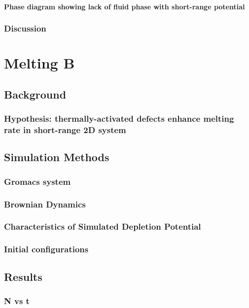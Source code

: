 \documentclass{umthesis}
\begin{document}
\subsubsection{Phase diagram showing lack of fluid phase with short-range potential}
\label{sec-1.3.13}
\subsection{Discussion}
\label{sec-1.3.14}
\chapter{Melting B}
\label{sec-2}
\section{Background}
\label{sec-2.1}
\subsection{Hypothesis: thermally-activated defects enhance melting rate in short-range 2D system}
\label{sec-2.1.1}
\section{Simulation Methods}
\label{sec-2.2}
\subsection{Gromacs system}
\label{sec-2.2.1}
\subsection{Brownian Dynamics}
\label{sec-2.2.2}
\subsection{Characteristics of Simulated Depletion Potential}
\label{sec-2.2.3}
\subsection{Initial configurations}
\label{sec-2.2.4}
\section{Results}
\label{sec-2.3}
\subsection{N vs t}
\label{sec-2.3.1}
\end{document}
